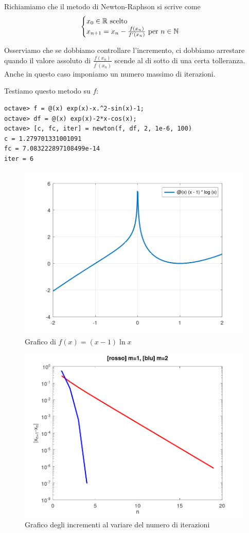 Richiamiamo che il metodo di \textenglish{Newton-Raphson} si scrive come
\[\begin{cases} x_0 \in \mathbb R \text{ scelto} \\ x_{n+1} = x_n - \frac{f(x_n)}{f^\prime (x_n)} \text{ per } n \in \mathbb N \end{cases}\]

Osserviamo che se dobbiamo controllare l'incremento, ci dobbiamo arrestare quando il valore assoluto di \(\frac{f(x_n)}{f^\prime (x_n)}\) scende al di sotto di una certa tolleranza. Anche in questo caso imponiamo un numero massimo di iterazioni. 



Testiamo questo metodo su \(f\):

\begin{lstlisting}[numbers=none]
octave> f = @(x) exp(x)-x.^2-sin(x)-1;
octave> df = @(x) exp(x)-2*x-cos(x);
octave> [c, fc, iter] = newton(f, df, 2, 1e-6, 100)
c = 1.279701331001091
fc = 7.083222897108499e-14
iter = 6
\end{lstlisting}


\begin{figure}
\centering
\includegraphics[width=.7\textwidth]{../zeri/graph2.png}
\caption{Grafico di \(f(x) = (x-1)\ln x\)}
\end{figure}

\begin{figure}
\centering
\includegraphics[width=.7\textwidth]{../zeri/convergences.png}
\caption{Grafico degli incrementi al variare del numero di iterazioni}
\end{figure}

